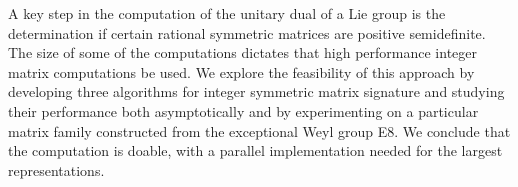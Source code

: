 A key step in the computation of the unitary dual of a Lie group is
the determination if certain rational symmetric matrices are positive
semidefinite. The size of some of the computations dictates that high
performance integer matrix computations be used.  We explore the
feasibility of this approach by developing three algorithms for
integer symmetric matrix signature and studying their performance both
asymptotically and by experimenting on a particular matrix family
constructed from the exceptional Weyl group E8.  We conclude that the
computation is doable, with a parallel implementation needed for the
largest representations.


